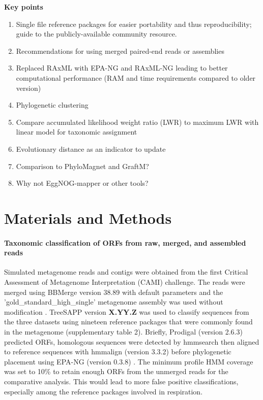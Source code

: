 \documentclass[10pt,letterpaper]{article}
\begin{document}
\textbf{Key points}
\begin{enumerate}
\item Single file reference packages for easier portability and thus reproducibility; guide to the publicly-available community resource.
\item Recommendations for using merged paired-end reads or assemblies
\item Replaced RAxML with EPA-NG and RAxML-NG leading to better computational performance (RAM and time requirements compared to older version)
\item Phylogenetic clustering
\item Compare accumulated likelihood weight ratio (LWR) to maximum LWR with linear model for taxonomic assignment
\item Evolutionary distance as an indicator to update
\item Comparison to PhyloMagnet and GraftM?
\item Why not EggNOG-mapper or other tools?
\end{enumerate}

\section*{Materials and Methods}

\paragraph{}

\paragraph{Taxonomic classification of ORFs from raw, merged, and assembled reads}

Simulated metagenome reads and contigs were obtained from the first Critical Assessment of Metagenome Interpretation (CAMI) challenge\cite{Sczyrba2017}. The reads were merged using BBMerge version 38.89 with default parameters and the 'gold\_standard\_high\_single' metagenome assembly was used without modification \citep{Bushnell2017}. TreeSAPP version \textbf{X.YY.Z} was used to classify sequences from the three datasets using nineteen reference packages that were commonly found in the metagenome (supplementary table 2). Briefly, Prodigal (version 2.6.3) predicted ORFs, homologous sequences were detected by hmmsearch then aligned to reference sequences with hmmalign (version 3.3.2) before phylogenetic placement using EPA-NG (version 0.3.8) \citep{Hyatt2012, Eddy1998a, Barbera2018}. The minimum profile HMM coverage was set to 10\% to retain enough ORFs from the unmerged reads for the comparative analysis. This would lead to more false positive classifications, especially among the reference packages involved in respiration.
\end{document}
